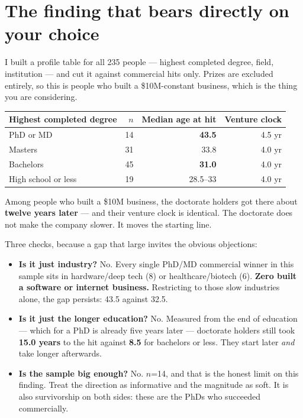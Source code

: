 \documentclass[11pt]{article}
\begin{document}
\section{The finding that bears directly on your choice}

I built a profile table for all 235 people --- highest completed degree, field,
institution --- and cut it against commercial hits only. Prizes are excluded
entirely, so this is people who built a \$10M-constant business, which is the
thing you are considering.

\begin{table}[h]
\centering
\begin{tabular}{lrrr}
\toprule
Highest completed degree & $n$ & Median age at hit & Venture clock \\
\midrule
PhD or MD & 14 & \textbf{43.5} & 4.5 yr \\
Masters & 31 & 33.8 & 4.0 yr \\
Bachelors & 45 & \textbf{31.0} & 4.0 yr \\
High school or less & 19 & 28.5--33 & 4.0 yr \\
\bottomrule
\end{tabular}
\end{table}

Among people who built a \$10M business, the doctorate holders got there about
\textbf{twelve years later} --- and their venture clock is identical. The
doctorate does not make the company slower. It moves the starting line.

Three checks, because a gap that large invites the obvious objections:

\begin{itemize}
\item \textbf{Is it just industry?} No. Every single PhD/MD commercial winner in
this sample sits in hardware/deep tech (8) or healthcare/biotech (6).
\textbf{Zero built a software or internet business.} Restricting to those slow
industries alone, the gap persists: 43.5 against 32.5.
\item \textbf{Is it just the longer education?} No. Measured from the end of
education --- which for a PhD is already five years later --- doctorate holders
still took \textbf{15.0 years} to the hit against \textbf{8.5} for bachelors or
less. They start later \emph{and} take longer afterwards.
\item \textbf{Is the sample big enough?} No. $n$=14, and that is the honest
limit on this finding. Treat the direction as informative and the magnitude as
soft. It is also survivorship on both sides: these are the PhDs who succeeded
commercially.
\end{itemize}
\end{document}
